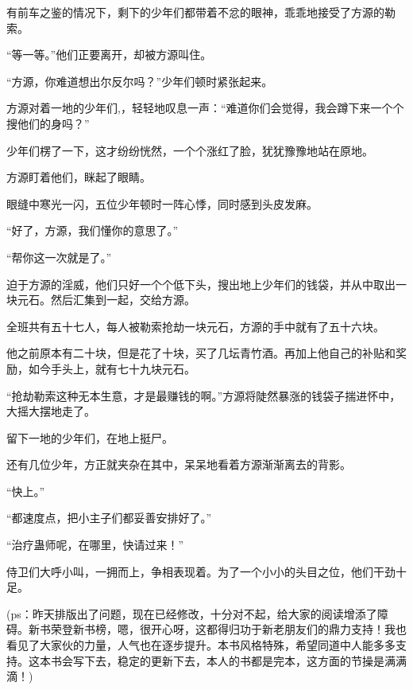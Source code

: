 \begin{this_body}
有前车之鉴的情况下，剩下的少年们都带着不忿的眼神，乖乖地接受了方源的勒索。

“等一等。”他们正要离开，却被方源叫住。

“方源，你难道想出尔反尔吗？”少年们顿时紧张起来。

方源对着一地的少年们,，轻轻地叹息一声：“难道你们会觉得，我会蹲下来一个个搜他们的身吗？”

少年们楞了一下，这才纷纷恍然，一个个涨红了脸，犹犹豫豫地站在原地。

方源盯着他们，眯起了眼睛。

眼缝中寒光一闪，五位少年顿时一阵心悸，同时感到头皮发麻。

“好了，方源，我们懂你的意思了。”

“帮你这一次就是了。”

迫于方源的淫威，他们只好一个个低下头，搜出地上少年们的钱袋，并从中取出一块元石。然后汇集到一起，交给方源。

全班共有五十七人，每人被勒索抢劫一块元石，方源的手中就有了五十六块。

他之前原本有二十块，但是花了十块，买了几坛青竹酒。再加上他自己的补贴和奖励，如今手头上，就有七十九块元石。

“抢劫勒索这种无本生意，才是最赚钱的啊。”方源将陡然暴涨的钱袋子揣进怀中，大摇大摆地走了。

留下一地的少年们，在地上挺尸。

还有几位少年，方正就夹杂在其中，呆呆地看着方源渐渐离去的背影。

“快上。”

“都速度点，把小主子们都妥善安排好了。”

“治疗蛊师呢，在哪里，快请过来！”

侍卫们大呼小叫，一拥而上，争相表现着。为了一个小小的头目之位，他们干劲十足。

(ps：昨天排版出了问题，现在已经修改，十分对不起，给大家的阅读增添了障碍。新书荣登新书榜，嗯，很开心呀，这都得归功于新老朋友们的鼎力支持！我也看见了大家伙的力量，人气也在逐步提升。本书风格特殊，希望同道中人能多多支持。这本书会写下去，稳定的更新下去，本人的书都是完本，这方面的节操是满满滴！)

\end{this_body}

